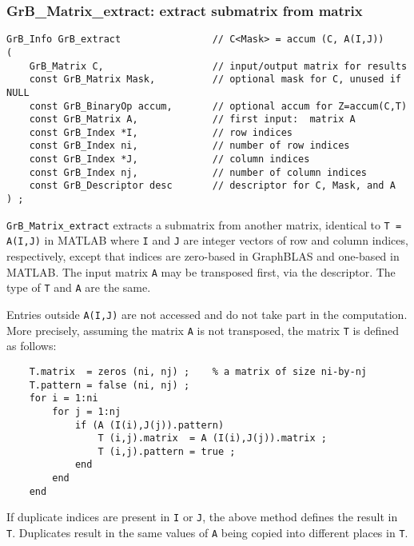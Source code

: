 \documentclass[12pt]{article}
\begin{document}
\newpage
\subsubsection{{\sf GrB\_Matrix\_extract:} extract submatrix from matrix}
\label{extract_matrix}

\begin{mdframed}[userdefinedwidth=6in]
{\footnotesize
\begin{verbatim}
GrB_Info GrB_extract                // C<Mask> = accum (C, A(I,J))
(
    GrB_Matrix C,                   // input/output matrix for results
    const GrB_Matrix Mask,          // optional mask for C, unused if NULL
    const GrB_BinaryOp accum,       // optional accum for Z=accum(C,T)
    const GrB_Matrix A,             // first input:  matrix A
    const GrB_Index *I,             // row indices
    const GrB_Index ni,             // number of row indices
    const GrB_Index *J,             // column indices
    const GrB_Index nj,             // number of column indices
    const GrB_Descriptor desc       // descriptor for C, Mask, and A
) ;
\end{verbatim} } \end{mdframed}

\verb'GrB_Matrix_extract' extracts a submatrix from another matrix, identical
to \verb'T = A(I,J)' in MATLAB where \verb'I' and \verb'J' are integer vectors
of row and column indices, respectively, except that indices are zero-based in
GraphBLAS and one-based in MATLAB.  The input matrix \verb'A' may be transposed
first, via the descriptor.  The type of \verb'T' and \verb'A' are the same.

Entries outside \verb'A(I,J)' are not accessed and do not take part in the
computation.  More precisely, assuming the matrix \verb'A' is not transposed,
the matrix \verb'T' is defined as follows:

    {\footnotesize
    \begin{verbatim}
    T.matrix  = zeros (ni, nj) ;    % a matrix of size ni-by-nj
    T.pattern = false (ni, nj) ;
    for i = 1:ni
        for j = 1:nj
            if (A (I(i),J(j)).pattern)
                T (i,j).matrix  = A (I(i),J(j)).matrix ;
                T (i,j).pattern = true ;
            end
        end
    end \end{verbatim}}

If duplicate indices are present in \verb'I' or \verb'J', the above method
defines the result in \verb'T'.  Duplicates result in the same values of
\verb'A' being copied into different places in \verb'T'.
\end{document}
